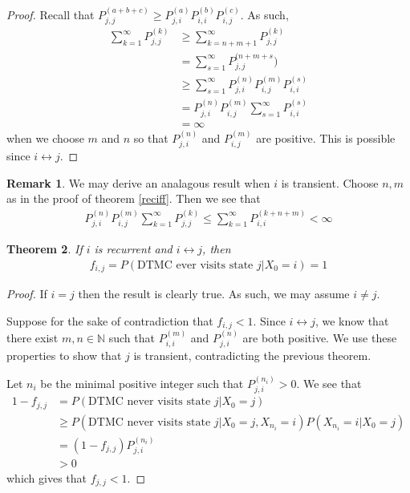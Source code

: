 \documentclass[11pt]{amsart}
\newtheorem{theorem}{Theorem}[section]
\theoremstyle{definition}
\newtheorem{remark}[theorem]{Remark}
\numberwithin{equation}{section}
\begin{document}
 \begin{proof}
     Recall that $P_{j,j}^{(a+b+c)}\ge P_{j,i}^{(a)}P_{i,i}^{(b)}P_{i,j}^{(c)}$. As such,
     \begin{align*}
         \sum_{k=1}^\infty P_{j,j}^{(k)}&\ge\sum_{k=n+m+1}^\infty P_{j,j}^{(k)}\\
         &=\sum_{s=1}^\infty P_{j,j}^{(n+m+s})\\
         &\ge\sum_{s=1}^\infty P_{j,i}^{(n)}P_{i,j}^{(m)}P_{i,i}^{(s)}\\
         &=P_{j,i}^{(n)}P_{i,j}^{(m)}\sum_{s=1}^\infty P_{i,i}^{(s)}\\
         &=\infty
     \end{align*}
     when we choose $m$ and $n$ so that $P_{j,i}^{(n)}$ and $P_{i,j}^{(m)}$ are positive. This is possible since $i\leftrightarrow j$.
 \end{proof}
 \begin{remark}
     We may derive an analagous result when $i$ is transient. Choose $n,m$ as in the proof of theorem \ref{reciff}. Then we see that 
     \begin{align*}
         P_{j,i}^{(n)}P_{i,j}^{(m)}\sum_{k=1}^\infty P_{j,j}^{(k)}\le\sum_{k=1}^\infty P_{i,i}^{(k+n+m)}<\infty
     \end{align*}
 \end{remark}
 \begin{theorem}
     If $i$ is recurrent and $i\leftrightarrow j$, then 
     \begin{align*}
         f_{i,j}=P(\text{DTMC ever visits state }j|X_0=i)=1
     \end{align*}
 \end{theorem}
 \begin{proof}
     If $i=j$ then the result is clearly true. As such, we may assume $i\ne j$.

     Suppose for the sake of contradiction that $f_{i,j}<1$. Since $i\leftrightarrow j$, we know that there exist $m,n\in\mathbb N$ such that $P_{i,i}^{(m)}$ and $P_{j,i}^{(n)}$ are both positive. We use these properties to show that $j$ is transient, contradicting the previous theorem.

     Let $n_i$ be the minimal positive integer such that $P_{j,i}^{(n_i)}>0$. We see that 
     \begin{align*}
         1-f_{j,j}&=P(\text{DTMC never visits state }j|X_0=j)\\
         &\ge P(\text{DTMC never visits state }j|X_0=j,X_{n_i}=i)P(X_{n_i}=i|X_0=j)\\
         &=(1-f_{j,j})P_{j,i}^{(n_i)}\\
         &>0
     \end{align*}
     which gives that $f_{j,j}<1$.
 \end{proof}
\end{document}
